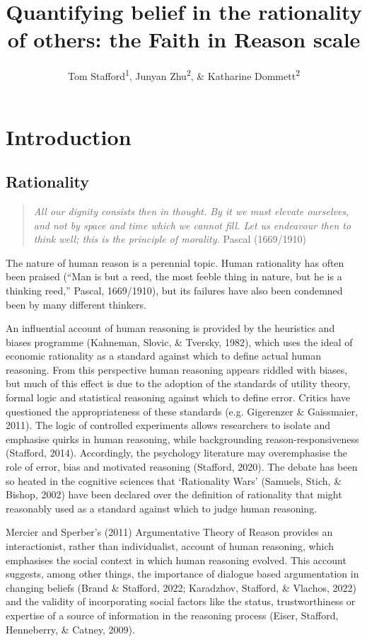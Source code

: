 \documentclass[
  ,jou,floatsintext]{apa6}
\title{Quantifying belief in the rationality of others: the Faith in Reason scale}
\author{Tom Stafford\textsuperscript{1}, Junyan Zhu\textsuperscript{2}, \& Katharine Dommett\textsuperscript{2}}
\date{}
\affiliation{\vspace{0.5cm}\textsuperscript{1} Department of Psychology, University of Sheffield, UK\\\textsuperscript{2} Department of Politics and International Relations, University of Sheffield, UK}
\begin{document}
\maketitle

\hypertarget{introduction}{%
\section{Introduction}\label{introduction}}

\hypertarget{rationality}{%
\subsection{Rationality}\label{rationality}}

\begin{quote}
\emph{All our dignity consists then in thought. By it we must elevate ourselves, and not by space and time which we cannot fill. Let us endeavour then to think well; this is the principle of morality.}
Pascal (1669/1910)
\end{quote}

The nature of human reason is a perennial topic. Human rationality has often been praised (``Man is but a reed, the most feeble thing in nature, but he is a thinking reed,'' Pascal, 1669/1910), but its failures have also been condemned been by many different thinkers.

An influential account of human reasoning is provided by the heuristics and biases programme (Kahneman, Slovic, \& Tversky, 1982), which uses the ideal of economic rationality as a standard against which to define actual human reasoning. From this perspective human reasoning appears riddled with biases, but much of this effect is due to the adoption of the standards of utility theory, formal logic and statistical reasoning against which to define error. Critics have questioned the appropriateness of these standards (e.g. Gigerenzer \& Gaissmaier, 2011). The logic of controlled experiments allows researchers to isolate and emphasise quirks in human reasoning, while backgrounding reason-responsiveness (Stafford, 2014). Accordingly, the psychology literature may overemphasise the role of error, bias and motivated reasoning (Stafford, 2020). The debate has been so heated in the cognitive sciences that `Rationality Wars' (Samuels, Stich, \& Bishop, 2002) have been declared over the definition of rationality that might reasonably used as a standard against which to judge human reasoning.

Mercier and Sperber's (2011) Argumentative Theory of Reason provides an interactionist, rather than individualist, account of human reasoning, which emphasises the social context in which human reasoning evolved. This account suggests, among other things, the importance of dialogue based argumentation in changing beliefs (Brand \& Stafford, 2022; Karadzhov, Stafford, \& Vlachos, 2022) and the validity of incorporating social factors like the status, trustworthiness or expertise of a source of information in the reasoning process (Eiser, Stafford, Henneberry, \& Catney, 2009).
\end{document}
